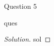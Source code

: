 \begin{solution}{Question 5}\label{ques:5}
    \begin{question}
        ques
    \end{question}
    \tcblower{}
    \begin{proof}[Solution]
        sol
    \end{proof}
\end{solution}
